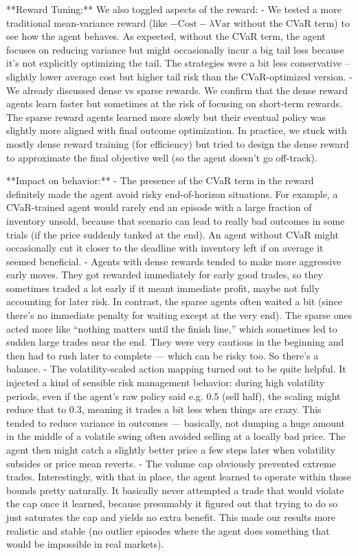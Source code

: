 \documentclass[11pt]{article}
\begin{document}
		**Reward Tuning:** 
		We also toggled aspects of the reward:
		- We tested a more traditional mean-variance reward (like $-\text{Cost} - \lambda \text{Var}$ without the CVaR term) to see how the agent behaves. As expected, without the CVaR term, the agent focuses on reducing variance but might occasionally incur a big tail loss because it’s not explicitly optimizing the tail. The strategies were a bit less conservative – slightly lower average cost but higher tail risk than the CVaR-optimized version.
		- We already discussed dense vs sparse rewards. We confirm that the dense reward agents learn faster but sometimes at the risk of focusing on short-term rewards. The sparse reward agents learned more slowly but their eventual policy was slightly more aligned with final outcome optimization. In practice, we stuck with mostly dense reward training (for efficiency) but tried to design the dense reward to approximate the final objective well (so the agent doesn’t go off-track).
		
		**Impact on behavior:**
		- The presence of the CVaR term in the reward definitely made the agent avoid risky end-of-horizon situations. For example, a CVaR-trained agent would rarely end an episode with a large fraction of inventory unsold, because that scenario can lead to really bad outcomes in some trials (if the price suddenly tanked at the end). An agent without CVaR might occasionally cut it closer to the deadline with inventory left if on average it seemed beneficial.
		- Agents with dense rewards tended to make more aggressive early moves. They got rewarded immediately for early good trades, so they sometimes traded a lot early if it meant immediate profit, maybe not fully accounting for later risk. In contrast, the sparse agents often waited a bit (since there’s no immediate penalty for waiting except at the very end). The sparse ones acted more like “nothing matters until the finish line,” which sometimes led to sudden large trades near the end. They were very cautious in the beginning and then had to rush later to complete — which can be risky too. So there’s a balance.
		- The volatility-scaled action mapping turned out to be quite helpful. It injected a kind of sensible risk management behavior: during high volatility periods, even if the agent’s raw policy said e.g. 0.5 (sell half), the scaling might reduce that to 0.3, meaning it trades a bit less when things are crazy. This tended to reduce variance in outcomes — basically, not dumping a huge amount in the middle of a volatile swing often avoided selling at a locally bad price. The agent then might catch a slightly better price a few steps later when volatility subsides or price mean reverts.
		- The volume cap obviously prevented extreme trades. Interestingly, with that in place, the agent learned to operate within those bounds pretty naturally. It basically never attempted a trade that would violate the cap once it learned, because presumably it figured out that trying to do so just saturates the cap and yields no extra benefit. This made our results more realistic and stable (no outlier episodes where the agent does something that would be impossible in real markets).
		
\end{document}
